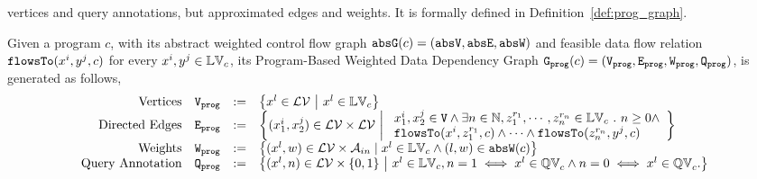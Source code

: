{vertices and query annotations, but approximated edges and weights.  
It is formally defined in Definition~\ref{def:prog_graph}.
\begin{defn}
\label{def:prog_graph}
Given a program $c$, with its abstract weighted control flow graph $\mathtt{abs}{\mathtt{G}}(c) = (\mathtt{abs}{\mathtt{V}}, \mathtt{abs}{\mathtt{E}}, \mathtt{abs}{\mathtt{W}})$ and 
feasible data flow relation $\mathtt{flowsTo}(x^i, y^j, c)$ for every $x^i, y^j \in \mathbb{LV}_c$, its Program-Based Weighted Data Dependency Graph
$\mathtt{{G_{prog}}}(c) = (\mathtt{{V_{prog}}}, \mathtt{{E_{prog}}}, \mathtt{{W_{prog}}}, \mathtt{{Q_{prog}}})$,
is generated as follows,
{\footnotesize
\[
\begin{array}{rlcl}
\text{Vertices} &
\progV & := & \left\{ 
x^l \in \mathcal{LV} 
~ \middle\vert ~
x^l \in \lvar_{c}
\right\}
\\
\text{Directed Edges} &
\progE & := & 
\left\{ 
({x}_1^{i}, {x}_2^{j}) \in \mathcal{LV} \times \mathcal{LV}
~ \middle\vert ~
\begin{array}{l}
{x}_1^{i}, {x}_2^{j} \in \vertxs
\land
\exists n \in \mathbb{N}, z_1^{r_1}, \cdots, z_n^{r_n} \in \lvar_{{c}} \sthat  
n \geq 0 \land
\\
\flowsto(x^i,  z_1^{r_1}, c) 
\land \cdots \land \flowsto(z_n^{r_n}, y^j, c) 
\end{array}
\right\}
\\
\text{Weights} &
\progW & := &
\left\{ (x^l, w) \in  \mathcal{LV} \times \mathcal{A}_{in}
\mid
x^l \in \lvar_{{c}} \land (l, w) \in \absW(c)
\right\}
\\
\text{Query Annotation} &
\progF & := & 
\left\{(x^l, n)  \in  \mathcal{LV} \times \{0, 1\} 
~ \middle\vert ~
x^l \in \lvar_{c},
n = 1 \iff x^l \in \qvar_{c} \land n = 0 \iff  x^l \in \qvar_{c} .
\right\}
\end{array}
\] }
\end{defn}
}
